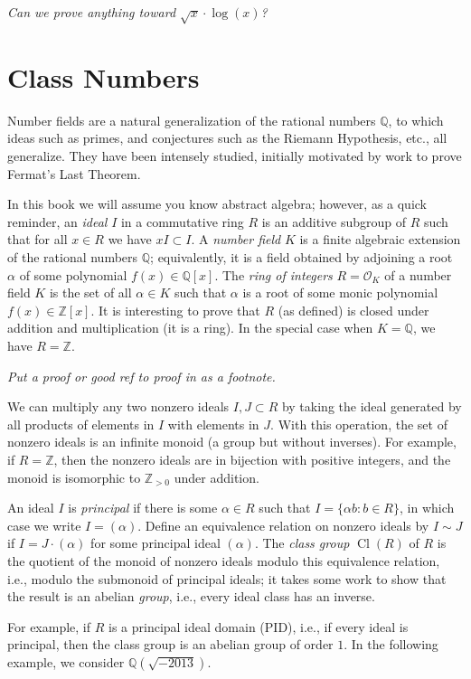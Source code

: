 \documentclass{book}
\DeclareMathOperator{\Cl}{Cl}
\newcommand{\Q}{\mathbb{Q}}
\newcommand{\Z}{\mathbb{Z}}
\renewcommand{\O}{\mathcal{O}}
\newcommand{\hw}[2]{\par\vspace{1em}{\bf HW (#1):} {\em #2}\par\vspace{1em}}
\begin{document}
\hw{Andrew and Bharath}{Can we prove anything toward $\sqrt{x}\cdot \log(x)$?}

\section{Class Numbers}
Number fields are a natural generalization of the rational numbers $\Q$,
to which ideas such as primes, and conjectures such as
the Riemann Hypothesis, etc., all generalize.  They have
been intensely studied, initially motivated by
work to prove Fermat's Last Theorem.

In this book we will assume you know abstract algebra; however,
as a quick reminder, an {\em ideal} $I$ in a commutative ring $R$ is an additive subgroup of $R$ such that for all $x\in R$ we have $xI \subset I$.
A {\em number field} $K$ is a finite algebraic extension of
the rational numbers $\Q$; equivalently, it is a field obtained
by adjoining a root $\alpha$ of some polynomial $f(x) \in \Q[x]$.
The {\em ring of integers} $R=\O_K$ of a number field $K$ is the
set of all $\alpha\in K$ such that $\alpha$ is a root of some
monic polynomial $f(x)\in\Z[x]$.  It is interesting to prove
that $R$ (as defined) is closed under addition and multiplication
(it is a ring).
In the special case when $K=\Q$, we have $R=\Z$.
\hw{Volunteer!}{Put a proof or good ref to proof in as a footnote.}

We can multiply any two nonzero ideals $I, J\subset R$ by taking
the ideal generated by all products of elements in $I$ with elements
in $J$.  With this operation, the set of nonzero ideals is an infinite
monoid (a group but without inverses).
For example, if $R=\Z$, then the nonzero ideals are in
bijection with positive integers, and the monoid is isomorphic to
$\Z_{>0}$ under addition.

An ideal $I$ is {\em principal} if there is some $\alpha \in R$ such
that $I = \{\alpha b : b \in R\}$, in which case we write $I=(\alpha)$.
Define an equivalence relation on nonzero ideals by
$I\sim J$ if $I=J\cdot (\alpha)$ for some principal ideal
$(\alpha)$.
The {\em class group} $\Cl(R)$ of $R$ is the quotient of the monoid of
nonzero ideals modulo this equivalence relation, i.e., modulo the
submonoid of principal ideals; it takes some work to show that
the result is an abelian {\em group}, i.e., every ideal class
has an inverse.

For example, if $R$ is a principal ideal domain (PID), i.e., if
every ideal is principal, then the class group is an abelian group
of order $1$.   In the following example, we consider $\Q(\sqrt{-2013})$.
\end{document}
